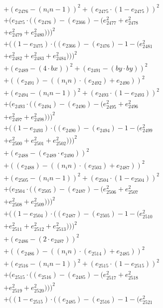\documentclass[10pt, a4paper]{article}
\begin{document}
\begin{align*}
& + (e_{2476} - (n_in - 1))^{2} + (e_{2475}  \cdot  (1 - e_{2475}))^{2} \\
& + (e_{2475}  \cdot  ((e_{2476}) - (e_{2366}) - (e_{2477}^{2} + e_{2478}^{2} \\
& + e_{2479}^{2} + e_{2480}^{2})))^{2} \\
& + ((1 - e_{2475})  \cdot  ((e_{2366}) - (e_{2476}) - 1 - (e_{2481}^{2} \\
& + e_{2482}^{2} + e_{2483}^{2} + e_{2484}^{2})))^{2} \\
& + (e_{2489} - (4  \cdot  bx))^{2} + (e_{2491} - (by  \cdot  by))^{2} \\
& + ((e_{2491}) - ((n_in)  \cdot  (e_{2492}) + e_{2490}))^{2} \\
& + (e_{2494} - (n_in - 1))^{2} + (e_{2493}  \cdot  (1 - e_{2493}))^{2} \\
& + (e_{2493}  \cdot  ((e_{2494}) - (e_{2490}) - (e_{2495}^{2} + e_{2496}^{2} \\
& + e_{2497}^{2} + e_{2498}^{2})))^{2} \\
& + ((1 - e_{2493})  \cdot  ((e_{2490}) - (e_{2494}) - 1 - (e_{2499}^{2} \\
& + e_{2500}^{2} + e_{2501}^{2} + e_{2502}^{2})))^{2} \\
& + (e_{2488} - (e_{2489}  \cdot  e_{2490}))^{2} \\
& + ((e_{2488}) - ((n_in)  \cdot  (e_{2503}) + e_{2487}))^{2} \\
& + (e_{2505} - (n_in - 1))^{2} + (e_{2504}  \cdot  (1 - e_{2504}))^{2} \\
& + (e_{2504}  \cdot  ((e_{2505}) - (e_{2487}) - (e_{2506}^{2} + e_{2507}^{2} \\
& + e_{2508}^{2} + e_{2509}^{2})))^{2} \\
& + ((1 - e_{2504})  \cdot  ((e_{2487}) - (e_{2505}) - 1 - (e_{2510}^{2} \\
& + e_{2511}^{2} + e_{2512}^{2} + e_{2513}^{2})))^{2} \\
& + (e_{2486} - (2  \cdot  e_{2487}))^{2} \\
& + ((e_{2486}) - ((n_in)  \cdot  (e_{2514}) + e_{2485}))^{2} \\
& + (e_{2516} - (n_in - 1))^{2} + (e_{2515}  \cdot  (1 - e_{2515}))^{2} \\
& + (e_{2515}  \cdot  ((e_{2516}) - (e_{2485}) - (e_{2517}^{2} + e_{2518}^{2} \\
& + e_{2519}^{2} + e_{2520}^{2})))^{2} \\
& + ((1 - e_{2515})  \cdot  ((e_{2485}) - (e_{2516}) - 1 - (e_{2521}^{2} \\

\end{align*}
\end{document}
